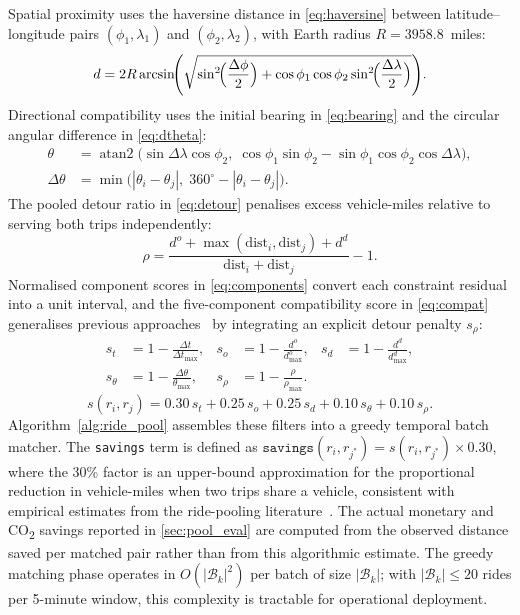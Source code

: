 \documentclass[a4paper,fleqn]{cas-dc}
\begin{document}
Spatial proximity uses the haversine distance in \eqref{eq:haversine} between latitude--longitude pairs $(\phi_1,\lambda_1)$ and $(\phi_2,\lambda_2)$, with Earth radius $R{=}3958.8$~miles:
\begin{equation}
  d = 2R\arcsin\!\Biggl(
    \sqrt{\sin^{2}\!\Bigl(\frac{\Delta\phi}{2}\Bigr)
    + \cos\phi_1\cos\phi_2\sin^{2}\!\Bigl(\frac{\Delta\lambda}{2}\Bigr)}
  \Biggr).
  \label{eq:haversine}
\end{equation}
Directional compatibility uses the initial bearing in \eqref{eq:bearing} and the circular angular difference in \eqref{eq:dtheta}:
\begin{align}
  \theta &= \operatorname{atan2}\!\bigl(
    \sin\Delta\lambda\cos\phi_2,\;
    \cos\phi_1\sin\phi_2 - \sin\phi_1\cos\phi_2\cos\Delta\lambda
  \bigr),
  \label{eq:bearing} \\
  \Delta\theta &= \min\bigl(|\theta_i-\theta_j|,\; 360^{\circ}-|\theta_i-\theta_j|\bigr).
  \label{eq:dtheta}
\end{align}
The pooled detour ratio in \eqref{eq:detour} penalises excess vehicle-miles relative to serving both trips independently:
\begin{equation}
  \rho = \frac{d^{o} + \max(\mathrm{dist}_i,\mathrm{dist}_j) + d^{d}}{\mathrm{dist}_i + \mathrm{dist}_j} - 1.
  \label{eq:detour}
\end{equation}
Normalised component scores in \eqref{eq:components} convert each constraint residual into a unit interval, and the five-component compatibility score in \eqref{eq:compat} generalises previous approaches~\cite{furuhata2013ridesharing} by integrating an explicit detour penalty $s_\rho$:
\begin{equation}
  \begin{aligned}
  s_t &= 1 - \frac{\Delta t}{\Delta t_{\max}}, &
  s_o &= 1 - \frac{d^{o}}{d^{o}_{\max}}, &
  s_d &= 1 - \frac{d^{d}}{d^{d}_{\max}}, \\
  s_\theta &= 1 - \frac{\Delta\theta}{\theta_{\max}}, &
  s_\rho &= 1 - \frac{\rho}{\rho_{\max}}.
  \end{aligned}
  \label{eq:components}
\end{equation}
\begin{equation}
  s(r_i, r_j) = 0.30\,s_t + 0.25\,s_o + 0.25\,s_d + 0.10\,s_\theta + 0.10\,s_\rho.
  \label{eq:compat}
\end{equation}
Algorithm~\ref{alg:ride_pool} assembles these filters into a greedy temporal batch matcher.  The \texttt{savings} term is defined as $\texttt{savings}(r_i, r_{j^*}) = s(r_i, r_{j^*}) \times 0.30$, where the 30\% factor is an upper-bound approximation for the proportional reduction in vehicle-miles when two trips share a vehicle, consistent with empirical estimates from the ride-pooling literature~\cite{santi2014quantifying}.  The actual monetary and CO\textsubscript{2} savings reported in \autoref{sec:pool_eval} are computed from the observed distance saved per matched pair rather than from this algorithmic estimate.  The greedy matching phase operates in $O(|\mathcal{B}_k|^2)$ per batch of size $|\mathcal{B}_k|$; with $|\mathcal{B}_k|\leq 20$ rides per 5-minute window, this complexity is tractable for operational deployment.
\end{document}
